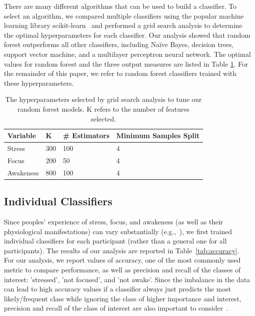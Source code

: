 There are many different algorithms that can be used to build a classifier. To select an
algorithm, we compared multiple classifiers using the popular machine learning library scikit-learn~\cite{pedregosa11} and performed a grid search analysis to determine the optimal hyperparameters for each classifier. Our analysis showed that random forest outperforms all other classifiers, including Na\"ive Bayes, decision trees, support vector machine, and a multilayer perceptron neural network. The optimal values for random forest and the three output measures are listed in Table \ref{tab:hyperparams}. For the remainder of this paper, we refer to random forest classifiers trained with these hyperparameters.%
\begin{table}[h]
	\begin{centering}
	\small\addtolength{\tabcolsep}{-1pt}
    \begin{tabular}{llll}
      \hline
      Variable & K & \# Estimators & Minimum Samples Split \\
      \hline
      Stress & 300 & 100 & 4\\
      Focus & 200 & 50 & 4\\
      Awakeness & 800 & 100 & 4\\
      \hline
    \end{tabular}
    \caption{The hyperparameters selected by grid search analysis to tune our random forest models. K refers to the number of features selected.}    \label{tab:hyperparams}
    \end{centering}
\end{table}

\subsection{Individual Classifiers}
Since peoples' experience of stress, focus, and awakeness (as well as
their physiological manifestations) can vary substantially
(e.g.,~\cite{Hernandez11}), we first trained individual classifiers
for each participant (rather than a general one for all
participants). The results of our analysis are reported in
Table~\ref{tab:accuracy}. For our analysis, we report values of
accuracy, one of the most commonly used metric to compare performance,
as well as precision and recall of the classes of interest:
'stressed', 'not focused', and 'not awake'. Since the imbalance in the
data can lead to high accuracy values if a classifier always just
predicts the most likely/frequent class while ignoring the class of
higher importance and interest, precision and recall of the class of
interest are also important to
consider~\cite{yap2014,bhattacharyya_data_2011,Hernandez11}.

